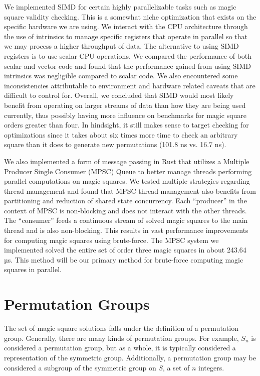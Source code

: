 \documentclass{rhumj_new}
\begin{document}
We implemented SIMD for certain highly parallelizable tasks such as magic square validity
checking. This is a somewhat niche optimization that exists on the specific hardware we are using.
We interact with the CPU architecture through the use of intrinsics to manage specific registers
that operate in parallel so that we may process a higher throughput of data. The alternative to
using SIMD registers is to use scalar CPU operations. We compared the performance of both scalar
and vector code and found that the performance gained from using SIMD intrinsics was negligible
compared to scalar code. We also encountered some inconsistencies attributable to environment and
hardware related caveats that are difficult to control for. Overall, we concluded that SIMD would
most likely benefit from operating on larger streams of data than how they are being used
currently, thus possibly having more influence on benchmarks for magic square orders greater than
four. In hindsight, it still makes sense to target checking for optimizations since it takes about
six times more time to check an arbitrary square than it does to generate new permutations (101.8
ns vs. 16.7 ns).

We also implemented a form of message passing in Rust that utilizes a Multiple Producer Single
Consumer (MPSC) Queue to better manage threads performing parallel computations on magic squares.
We tested multiple strategies regarding thread management and found that MPSC thread management
also benefits from partitioning and reduction of shared state concurrency. Each ``producer'' in the
context of MPSC is non-blocking and does not interact with the other threads. The ``consumer''
feeds a continuous stream of solved magic squares to the main thread and is also non-blocking. This
results in vast performance improvements for computing magic squares using brute-force. The MPSC
system we implemented solved the entire set of order three magic squares in about 243.64 µs. This
method will be our primary method for brute-force computing magic squares in parallel.

\section{Permutation Groups}

The set of magic square solutions falls under the definition of a permutation group.
Generally, there are many kinds of permutation groups. For example, $S_n$ is considered a
permutation group, but as a whole, it is typically considered a representation of the symmetric
group. Additionally, a permutation group may be considered a subgroup of the symmetric group on
$S$, a set of $n$ integers\cite{Whitelaw}.
\end{document}
